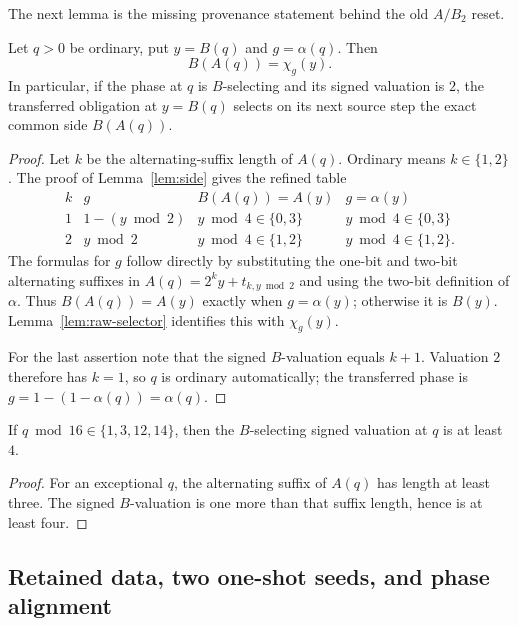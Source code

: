 The next lemma is the missing provenance statement behind the old
$A/B_2$ reset.

\begin{lemma}
\label{lem:second-selector}
Let $q>0$ be ordinary, put $y=B(q)$ and $g=\alpha(q)$.  Then
\[
 \boxed{B(A(q))=\chi_g(y).}
\]
In particular, if the phase at $q$ is $B$-selecting and its signed valuation
is $2$, the transferred obligation at $y=B(q)$ selects on its next source
step the exact common side $B(A(q))$.
\end{lemma}

\begin{proof}
Let $k$ be the alternating-suffix length of $A(q)$.  Ordinary means
$k\in\{1,2\}$.  The proof of Lemma~\ref{lem:side} gives the refined table
\[
\begin{array}{c|c|c|c}
 k&g& B(A(q))=A(y) & g=\alpha(y)\\ \hline
 1&1-(y\bmod2)&y\bmod4\in\{0,3\}&y\bmod4\in\{0,3\}\\
 2&y\bmod2&y\bmod4\in\{1,2\}&y\bmod4\in\{1,2\}.
\end{array}
\]
The formulas for $g$ follow directly by substituting the one-bit and two-bit
alternating suffixes in $A(q)=2^k y+t_{k,y\bmod2}$ and using the two-bit
definition of $\alpha$.  Thus $B(A(q))=A(y)$ exactly when
$g=\alpha(y)$; otherwise it is $B(y)$.  Lemma~\ref{lem:raw-selector}
identifies this with $\chi_g(y)$.

For the last assertion note that the signed $B$-valuation equals $k+1$.
Valuation $2$ therefore has $k=1$, so $q$ is ordinary automatically; the
transferred phase is $g=1-(1-\alpha(q))=\alpha(q)$.
\end{proof}

\begin{corollary}
\label{cor:exceptional-no-b2}
If $q\bmod16\in\{1,3,12,14\}$, then the $B$-selecting signed valuation at
$q$ is at least $4$.
\end{corollary}

\begin{proof}
For an exceptional $q$, the alternating suffix of $A(q)$ has length at least
three.  The signed $B$-valuation is one more than that suffix length, hence is
at least four.
\end{proof}

\subsection{Retained data, two one-shot seeds, and phase alignment}

